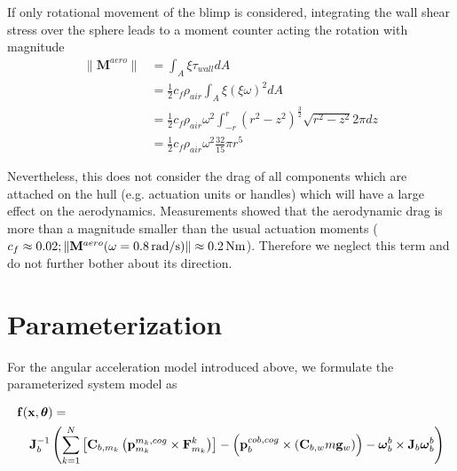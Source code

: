If only rotational movement of the blimp is considered, integrating the wall shear stress over the sphere leads to a moment counter acting the rotation with magnitude
\begin{align*}
\| \mathbf{M}^{aero} \|
&= \int_A \xi \tau_{wall} dA \\
&= \frac{1}{2} c_f \rho_{air} \int_A \xi (\xi \omega)^2 dA \\
&= \frac{1}{2} c_f \rho_{air} \omega^2 \int_{-r}^{r} (r^2-z^2)^{\frac{3}{2}} \sqrt{r^2-z^2} 2\pi dz \\
&= \frac{1}{2} c_f \rho_{air} \omega^2 \frac{32}{15} \pi r^5
\end{align*}

Nevertheless, this does not consider the drag of all components which are attached on the hull (e.g. actuation units or handles) which will have a large effect on the aerodynamics.
Measurements showed that the aerodynamic drag is more than a magnitude smaller than the usual actuation moments ($c_f \approx 0.02; \|\mathbf{M}^{aero}(\omega = \unit[0.8]{rad/s})\| \approx \unit[0.2]{Nm}$). Therefore we neglect this term and do not further bother about its direction.

%
%

\section{Parameterization}
For the angular acceleration model introduced above, we formulate the parameterized system model as

\begin{eqnarray}
\label{eq:sys_mod}
\lefteqn{
\mathbf{f}(\mathbf{x}, \boldsymbol{\theta}) = {}} \\
& & {} \mathbf{J}_b^{-1} \left( 
\sum_{k=1}^N  \left[  \mathbf{C}_{b,m_k} \left( \mathbf{p}^{m_k,cog}_{m_k} \times \mathbf{F}^k_{m_k} \right)  \right]
-
\left( \mathbf{p}^{cob,cog}_b \times (\mathbf{C}_{b,w}m\mathbf{g}_w) \right)
- \boldsymbol{\omega}_b^b \times \mathbf{J}_b \boldsymbol{\omega}_b^b \right) \nonumber
\end{eqnarray}

